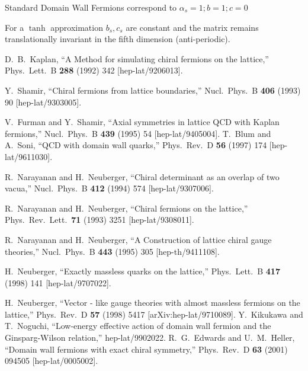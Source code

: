 \documentclass[letter,10pt]{report}
\begin{document}
Standard Domain Wall Fermions correspond to $\alpha_s=1 ; b=1 ; c=0$ 

For a $\tanh$ approximation $b_s, c_s$ are constant and the matrix remains
translationally invariant in the fifth dimension (anti-periodic).

\begin{thebibliography}{99}

  D.~B.~Kaplan,
  ``A Method for simulating chiral fermions on the lattice,''
  Phys.\ Lett.\ B {\bf 288} (1992) 342
  [hep-lat/9206013].

  Y.~Shamir,
  ``Chiral fermions from lattice boundaries,''
  Nucl.\ Phys.\ B {\bf 406} (1993) 90
  [hep-lat/9303005].


  V.~Furman and Y.~Shamir,
  ``Axial symmetries in lattice QCD with Kaplan fermions,''
  Nucl.\ Phys.\ B {\bf 439} (1995) 54
  [hep-lat/9405004].
  T.~Blum and A.~Soni,
  ``QCD with domain wall quarks,''
  Phys.\ Rev.\ D {\bf 56} (1997) 174
  [hep-lat/9611030].

  R.~Narayanan and H.~Neuberger,
  ``Chiral determinant as an overlap of two vacua,''
  Nucl.\ Phys.\ B {\bf 412} (1994) 574
  [hep-lat/9307006].

  R.~Narayanan and H.~Neuberger,
  ``Chiral fermions on the lattice,''
  Phys.\ Rev.\ Lett.\  {\bf 71} (1993) 3251
  [hep-lat/9308011].

  R.~Narayanan and H.~Neuberger,
  ``A Construction of lattice chiral gauge theories,''
  Nucl.\ Phys.\ B {\bf 443} (1995) 305
  [hep-th/9411108].

  H.~Neuberger,
  ``Exactly massless quarks on the lattice,''
  Phys.\ Lett.\ B {\bf 417} (1998) 141
  [hep-lat/9707022].



%
  H.~Neuberger,
  ``Vector - like gauge theories with almost massless fermions on the lattice,''
  Phys.\ Rev.\  D {\bf 57} (1998) 5417
  [arXiv:hep-lat/9710089].
  Y.~Kikukawa and T.~Noguchi,
  ``Low-energy effective action of domain wall fermion and the Ginsparg-Wilson relation,''
  hep-lat/9902022.
  R.~G.~Edwards and U.~M.~Heller,
  ``Domain wall fermions with exact chiral symmetry,''
  Phys.\ Rev.\ D {\bf 63} (2001) 094505
  [hep-lat/0005002].


\end{thebibliography}
\end{document}

